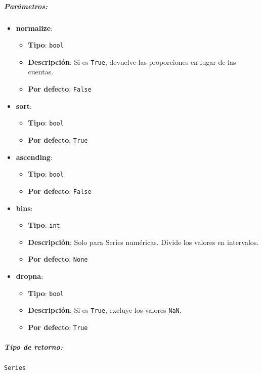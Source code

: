 \subparagraph{Parámetros:}
\begin{itemize}
    \item \textbf{normalize}:
          \begin{itemize}
              \item \textbf{Tipo}: \texttt{bool}
              \item \textbf{Descripción}: Si es \texttt{True}, devuelve las
                    proporciones en lugar de las cuentas.
              \item \textbf{Por defecto}: \texttt{False}
          \end{itemize}
    \item \textbf{sort}:
          \begin{itemize}
              \item \textbf{Tipo}: \texttt{bool}
              \item \textbf{Por defecto}: \texttt{True}
          \end{itemize}
    \item \textbf{ascending}:
          \begin{itemize}
              \item \textbf{Tipo}: \texttt{bool}
              \item \textbf{Por defecto}: \texttt{False}
          \end{itemize}
    \item \textbf{bins}:
          \begin{itemize}
              \item \textbf{Tipo}: \texttt{int}
              \item \textbf{Descripción}: Solo para Series numéricas. Divide
                    los valores en intervalos.
              \item \textbf{Por defecto}: \texttt{None}
          \end{itemize}
    \item \textbf{dropna}:
          \begin{itemize}
              \item \textbf{Tipo}: \texttt{bool}
              \item \textbf{Descripción}: Si es \texttt{True}, excluye los
                    valores \texttt{NaN}.
              \item \textbf{Por defecto}: \texttt{True}
          \end{itemize}
\end{itemize}
\subparagraph{Tipo de retorno:} \texttt{Series}


